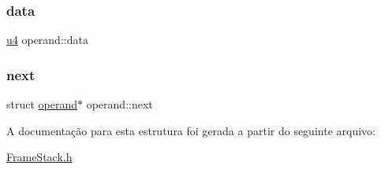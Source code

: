 \subsubsection{\texorpdfstring{data}{data}}
{\footnotesize\ttfamily \hyperlink{ClassLoader_8h_aedf6ddc03df8caaaccbb4c60b9a9b850}{u4} operand\+::data}

\mbox{\label{structoperand_abdf650090955fbf7cb74c6d8cbc12eef}} 
\subsubsection{\texorpdfstring{next}{next}}
{\footnotesize\ttfamily struct \hyperlink{structoperand}{operand}$\ast$ operand\+::next}



A documentação para esta estrutura foi gerada a partir do seguinte arquivo\+:\begin{DoxyCompactItemize}
\item 
\hyperlink{FrameStack_8h}{Frame\+Stack.\+h}\end{DoxyCompactItemize}
